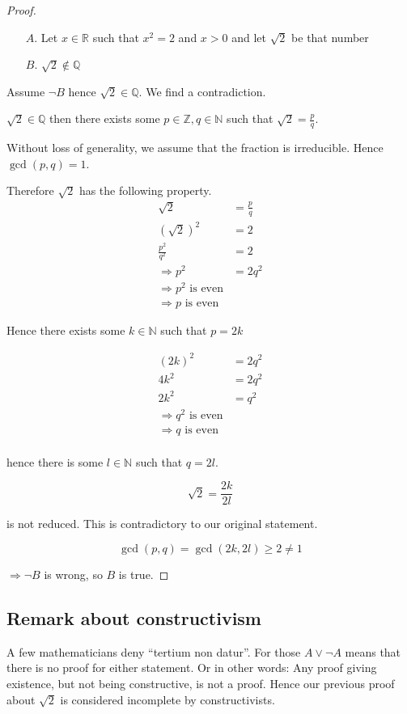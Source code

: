 \documentclass[a4paper,landscape,twocolumn]{article}
\begin{document}
\begin{proof}
%
\begin{itemize}
  \item[$A$.] Let $x \in \mathbb{R}$ such that $x^2 = 2$ and $x > 0$ and let $\sqrt{2}$ be that number
  \item[$B$.] $\sqrt{2} \not\in \mathbb{Q}$
\end{itemize}

Assume $\neg B$ hence $\sqrt{2} \in \mathbb{Q}$. We find a contradiction.

$\sqrt{2} \in \mathbb{Q}$ then there exists some $p \in \mathbb{Z}, q \in \mathbb{N}$ such that $\sqrt{2} = \frac{p}{q}$.

Without loss of generality, we assume that the fraction is irreducible. Hence $\operatorname{gcd}(p, q) = 1$.

Therefore $\sqrt{2}$ has the following property.
\begin{align*}
  \sqrt{2} &= \frac{p}{q} \\
  \left(\sqrt{2}\right)^2 &= 2 \\
  \frac{p^2}{q^2} &= 2 \\
  \Rightarrow p^2 &= 2 q^2 \\
  \Rightarrow p^2 \text{ is even} \\
  \Rightarrow p \text { is even }
\end{align*}

Hence there exists some $k \in \mathbb{N}$ such that $p = 2k$

\begin{align*}
  (2k)^2 &= 2q^2 \\
  4k^2 &= 2q^2 \\
  2k^2 &= q^2 \\
  \Rightarrow q^2 \text{ is even} \\
  \Rightarrow q \text{ is even} \\
\end{align*}

hence there is some $l \in \mathbb{N}$ such that $q = 2l$.

\[ \sqrt{2} = \frac{2k}{2l} \]

is not reduced. This is contradictory to our original statement.

\[ \operatorname{gcd}(p,q) = \operatorname{gcd}(2k, 2l) \geq 2 \neq 1 \]

$\Rightarrow \neg B$ is wrong, so $B$ is true.
\end{proof}

\subsection{Remark about constructivism}
%
A few mathematicians deny \enquote{tertium non datur}.
For those $A \lor \neg A$ means that there is no proof for either statement.
Or in other words: Any proof giving existence, but not being constructive, is not a proof.
Hence our previous proof about $\sqrt{2}$ is considered incomplete by constructivists.
\end{document}
